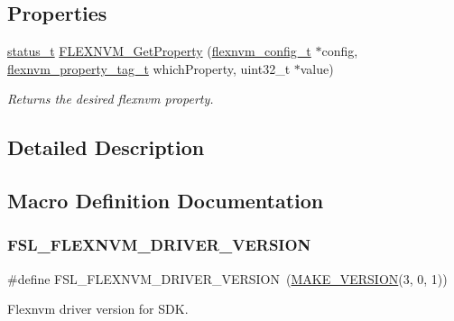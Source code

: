 \subsection*{Properties}
\begin{DoxyCompactItemize}
\item 
\mbox{\hyperlink{group__ksdk__common_gaaabdaf7ee58ca7269bd4bf24efcde092}{status\+\_\+t}} \mbox{\hyperlink{group__ftfx__flexnvm__driver_gac77ac9b06704e082d4b1f4bd1ed21fa0}{F\+L\+E\+X\+N\+V\+M\+\_\+\+Get\+Property}} (\mbox{\hyperlink{group__ftfx__flexnvm__driver_ga8fd4d473c0a4b30cac163160fb28a6c1}{flexnvm\+\_\+config\+\_\+t}} $\ast$config, \mbox{\hyperlink{group__ftfx__flexnvm__driver_ga355e24679a7d7d1228641e96806c19d9}{flexnvm\+\_\+property\+\_\+tag\+\_\+t}} which\+Property, uint32\+\_\+t $\ast$value)
\begin{DoxyCompactList}\small\item\em Returns the desired flexnvm property. \end{DoxyCompactList}\end{DoxyCompactItemize}


\subsection{Detailed Description}


\subsection{Macro Definition Documentation}
\mbox{\label{group__ftfx__flexnvm__driver_ga3edd4456238450f55464e5274aa7089b}} 
\subsubsection{\texorpdfstring{FSL\_FLEXNVM\_DRIVER\_VERSION}{FSL\_FLEXNVM\_DRIVER\_VERSION}}
{\footnotesize\ttfamily \#define F\+S\+L\+\_\+\+F\+L\+E\+X\+N\+V\+M\+\_\+\+D\+R\+I\+V\+E\+R\+\_\+\+V\+E\+R\+S\+I\+ON~(\mbox{\hyperlink{group__ftfx__utilities_ga812138aa3315b0c6953c1a26130bcc37}{M\+A\+K\+E\+\_\+\+V\+E\+R\+S\+I\+ON}}(3, 0, 1))}



Flexnvm driver version for S\+DK. 

